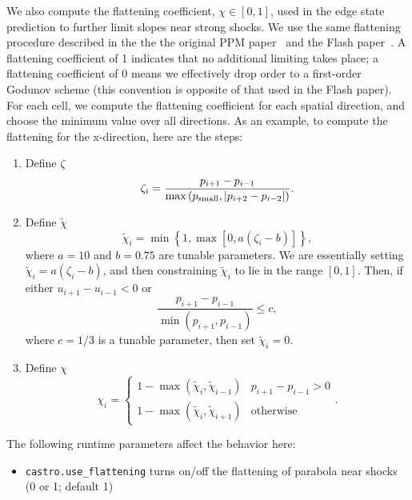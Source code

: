 We also compute the flattening coefficient, $\chi\in[0,1]$, used in
the edge state prediction to further limit slopes near strong shocks.
We use the same flattening procedure described in the the the original
PPM paper~\cite{ppm} and the Flash paper~\cite{flash}.
A flattening coefficient of 1 indicates that no additional limiting
takes place; a flattening coefficient of 0 means we effectively drop
order to a first-order Godunov scheme (this convention is opposite of
that used in the Flash paper).  For each cell, we compute the
flattening coefficient for each spatial direction, and choose the
minimum value over all directions.  As an example, to compute the
flattening for the x-direction, here are the steps:
\begin{enumerate}
\item Define $\zeta$
\begin{equation}
\zeta_i = \frac{p_{i+1}-p_{i-1}}{\max\left(p_{\rm small},|p_{i+2}-p_{i-2}|\right)}.
\end{equation}
\item Define $\tilde\chi$
\begin{equation}
\tilde\chi_i = \min\left\{1,\max[0,a(\zeta_i - b)]\right\},
\end{equation}
where $a=10$ and $b=0.75$ are tunable parameters.  We are essentially
setting $\tilde\chi_i=a(\zeta_i-b)$, and then constraining
$\tilde\chi_i$ to lie in the range $[0,1]$.  Then, if either
$u_{i+1}-u_{i-1}<0$ or
\begin{equation}
\frac{p_{i+1}-p_{i-1}}{\min(p_{i+1},p_{i-1})} \le c,
\end{equation}
where $c=1/3$ is a tunable parameter, then set $\tilde\chi_i=0$.
\item Define $\chi$
\begin{equation}
\chi_i =
\begin{cases}
1 - \max(\tilde\chi_i,\tilde\chi_{i-1}) & p_{i+1}-p_{i-1} > 0 \\
1 - \max(\tilde\chi_i,\tilde\chi_{i+1}) & \text{otherwise}
\end{cases}.
\end{equation}
\end{enumerate}

The following runtime parameters affect the behavior here:
\begin{itemize}
  \item {\tt castro.use\_flattening} turns on/off the flattening of parabola
  near shocks (0 or 1; default 1)
\end{itemize}


